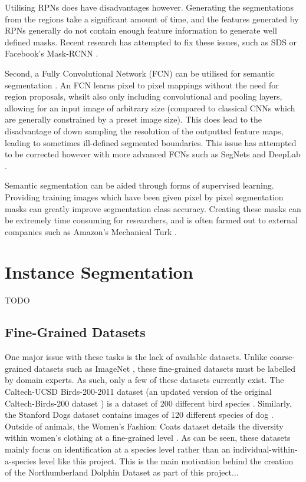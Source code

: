  Utilising RPNs does have disadvantages however. Generating the segmentations from the regions take a significant amount of time, and the features generated by RPNs generally do not contain enough feature information to generate well defined masks. Recent research has attempted to fix these issues, such as SDS \cite{hariharan_simultaneous_2014} or Facebook's Mask-RCNN \cite{he_mask_2017}.

Second, a Fully Convolutional Network (FCN) can be utilised for semantic segmentation \cite{long_fully_2014}. An FCN learns pixel to pixel mappings without the need for region proposals, whsilt also only including convolutional and pooling layers, allowing for an input image of arbitrary size (compared to classical CNNs which are generally constrained by a preset image size). This does lead to the disadvantage of down sampling the resolution of the outputted feature maps, leading to sometimes ill-defined segmented boundaries. This issue has attempted to be corrected however with more advanced FCNs such as SegNets \cite{badrinarayanan_segnet:_2015} and DeepLab \cite{chen_semantic_2014}. 

Semantic segmentation can be aided through forms of supervised learning. Providing training images which have been given pixel by pixel segmentation masks can greatly improve segmentation class accuracy. Creating these masks can be extremely time consuming for researchers, and is often farmed out to external companies such as Amazon's Mechanical Turk \cite{buhrmester_amazons_2011}.

\section{Instance Segmentation}\label{ch:Background,sec:instanceSegmentation}
TODO

\subsection{Fine-Grained Datasets}\label{ch:Background,sec:Fine-grainedCV,sub:FGDatasets}

One major issue with these tasks is the lack of available datasets. Unlike coarse-grained datasets such as ImageNet \cite{deng_imagenet:_2009}, these fine-grained datasets must be labelled by domain experts. As such, only a few of these datasets currently exist. The Caltech-UCSD Birds-200-2011 dataset (an updated version of the original Caltech-Birds-200 dataset \cite{welinder_caltech-ucsd_2010}) is a dataset of 200 different bird species \cite{wah_caltech-ucsd_2011}. Similarly, the Stanford Dogs dataset contains images of 120 different species of dog \cite{khosla_novel_2011}. Outside of animals, the Women's Fashion: Coats dataset details the diversity within women's clothing at a fine-grained level \cite{di_style_2013}. As can be seen, these datasets mainly focus on identification at a species level rather than an individual-within-a-species level like this project. This is the main motivation behind the creation of the Northumberland Dolphin Dataset as part of this project...

